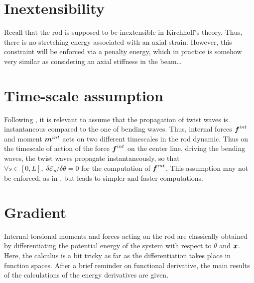 
\section{Inextensibility}
Recall that the rod is supposed to be inextensible in Kirchhoff’s theory. Thus, there is no stretching energy associated with an axial strain. However, this constraint will be enforced via a penalty energy, which in practice is somehow very similar as considering an axial stiffness in the beam…

\section{Time-scale assumption}
Following \cite{Bergou2008}, it is relevant to assume that the propagation of twist waves is instantaneous compared to the one of bending waves. Thus, internal forces $\boldsymbol{f}^{int}$ and moment $\boldsymbol{m}^{int}$ acts on two different timescales in the rod dynamic. Thus on the timescale of action of the force $\boldsymbol{f}^{int}$ on the center line, driving the bending waves, the twist waves propagate instantaneously, so that $\forall s \in [0,L],\; \delta\mathcal{E}_{p}/\delta\theta=0$ for the computation of $\boldsymbol{f}^{int}$. This assumption may not be enforced, as in \cite{Nabei2014}, but leads to simpler and faster computations.

\section{Gradient}
Internal torsional moments and forces acting on the rod are classically obtained by differentiating the potential energy of the system with respect to $\theta$ and $\boldsymbol{x}$. Here, the calculus is a bit tricky as far as the differentiation takes place in function spaces. After a brief reminder on functional derivative, the main results of the calculations of the energy derivatives are given.

